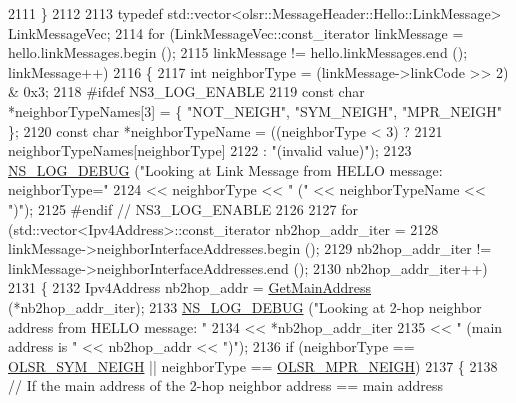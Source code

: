 \begin{DoxyCode}
2111         \}
2112 
2113       \textcolor{keyword}{typedef} std::vector<olsr::MessageHeader::Hello::LinkMessage> LinkMessageVec;
2114       \textcolor{keywordflow}{for} (LinkMessageVec::const\_iterator linkMessage = hello.linkMessages.begin ();
2115            linkMessage != hello.linkMessages.end (); linkMessage++)
2116         \{
2117           \textcolor{keywordtype}{int} neighborType = (linkMessage->linkCode >> 2) & 0x3;
2118 \textcolor{preprocessor}{#ifdef NS3\_LOG\_ENABLE}
2119           \textcolor{keyword}{const} \textcolor{keywordtype}{char} *neighborTypeNames[3] = \{ \textcolor{stringliteral}{"NOT\_NEIGH"}, \textcolor{stringliteral}{"SYM\_NEIGH"}, \textcolor{stringliteral}{"MPR\_NEIGH"} \};
2120           \textcolor{keyword}{const} \textcolor{keywordtype}{char} *neighborTypeName = ((neighborType < 3) ?
2121                                           neighborTypeNames[neighborType]
2122                                           : \textcolor{stringliteral}{"(invalid value)"});
2123           \hyperlink{group__logging_ga413f1886406d49f59a6a0a89b77b4d0a}{NS\_LOG\_DEBUG} (\textcolor{stringliteral}{"Looking at Link Message from HELLO message: neighborType="}
2124                         << neighborType << \textcolor{stringliteral}{" ("} << neighborTypeName << \textcolor{stringliteral}{")"});
2125 \textcolor{preprocessor}{#endif // NS3\_LOG\_ENABLE}
2126 
2127           \textcolor{keywordflow}{for} (std::vector<Ipv4Address>::const\_iterator nb2hop\_addr\_iter =
2128                  linkMessage->neighborInterfaceAddresses.begin ();
2129                nb2hop\_addr\_iter != linkMessage->neighborInterfaceAddresses.end ();
2130                nb2hop\_addr\_iter++)
2131             \{
2132               Ipv4Address nb2hop\_addr = \hyperlink{classns3_1_1olsr_1_1RoutingProtocol_ae01451170fb389d322b33ed6d954f460}{GetMainAddress} (*nb2hop\_addr\_iter);
2133               \hyperlink{group__logging_ga413f1886406d49f59a6a0a89b77b4d0a}{NS\_LOG\_DEBUG} (\textcolor{stringliteral}{"Looking at 2-hop neighbor address from HELLO message: "}
2134                             << *nb2hop\_addr\_iter
2135                             << \textcolor{stringliteral}{" (main address is "} << nb2hop\_addr << \textcolor{stringliteral}{")"});
2136               \textcolor{keywordflow}{if} (neighborType == \hyperlink{olsr-routing-protocol_8cc_a46286c316da9922151b354295e71d35a}{OLSR\_SYM\_NEIGH} || neighborType == 
      \hyperlink{olsr-routing-protocol_8cc_a08fbe0b4c74b944f681630df4fa0fd82}{OLSR\_MPR\_NEIGH})
2137                 \{
2138                   \textcolor{comment}{// If the main address of the 2-hop neighbor address == main address}

\end{DoxyCode}

